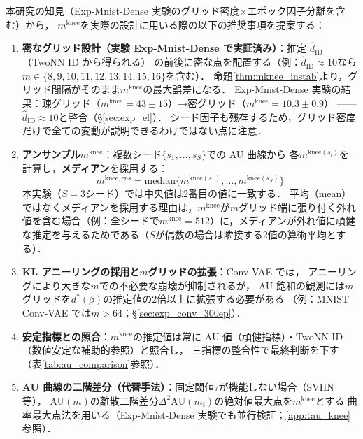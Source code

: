 \documentclass[11pt,a4paper]{jsarticle}
\newcommand{\mknee}{m^{\mathrm{knee}}}
\begin{document}
本研究の知見（Exp-Mnist-Dense 実験のグリッド密度×エポック因子分離を含む）から，
$\mknee$を実際の設計に用いる際の以下の推奨事項を提案する：
\begin{enumerate}
  \item \textbf{密なグリッド設計（実験 Exp-Mnist-Dense で実証済み）}：推定 $\hat{d}_\mathrm{ID}$（TwoNN ID から得られる）
        の前後に密な点を配置する（例：$\hat{d}_\mathrm{ID} \approx 10$なら$m \in \{8,9,10,11,12,13,14,15,16\}$を含む）．
        命題\ref{thm:mknee_instab}より，グリッド間隔がそのまま$\mknee$の最大誤差になる．
        Exp-Mnist-Dense 実験の結果：疎グリッド（$\mknee=43\pm15$）→密グリッド（$\mknee=10.3\pm0.9$）
        —— $\hat{d}_\mathrm{ID} \approx 10$と整合（§\ref{sec:exp_el}）．
        シード因子も残存するため，グリッド密度だけで全ての変動が説明できるわけではない点に注意．
  \item \textbf{アンサンブル$\mknee$}：複数シード$\{s_1,\ldots,s_S\}$での AU 曲線から
        各$m^{\mathrm{knee}(s_i)}$を計算し，\textbf{メディアン}を採用する：
        \begin{equation}
          m^{\mathrm{knee,ens}} = \mathrm{median}\bigl\{m^{\mathrm{knee}(s_1)}, \ldots, m^{\mathrm{knee}(s_S)}\bigr\}
          \label{eq:mknee_ens}
        \end{equation}
        本実験（$S=3$シード）では中央値は2番目の値に一致する．
        平均（mean）ではなくメディアンを採用する理由は，$\mknee$が$m$グリッド端に張り付く外れ値を含む場合（例：全シードで$\mknee=512$）に，メディアンが外れ値に頑健な推定を与えるためである（$S$が偶数の場合は隣接する2値の算術平均とする）．
  \item \textbf{KL アニーリングの採用と$m$グリッドの拡張}：Conv-VAE では，
        アニーリングにより大きな$m$での不必要な崩壊が抑制されるが，
        AU 飽和の観測には$m$グリッドを$d^*(\beta)$の推定値の2倍以上に拡張する必要がある
        （例：MNIST Conv-VAE では$m > 64$；§\ref{sec:exp_conv_300ep}）．
  \item \textbf{安定指標との照合}：$\mknee$の推定値は常に AU 値（頑健指標）・TwoNN ID（数値安定な補助的参照）と照合し，
        三指標の整合性で最終判断を下す（表\ref{tab:au_comparison}参照）．
  \item \textbf{AU 曲線の二階差分（代替手法）}：固定閾値$\tau$が機能しない場合（SVHN 等），
        AU$(m)$の離散二階差分$\Delta^2\mathrm{AU}(m_i)$の絶対値最大点を$\mknee$とする
        曲率最大点法を用いる（Exp-Mnist-Dense 実験でも並行検証；\ref{app:tau_knee}参照）．
\end{enumerate}
\end{document}
